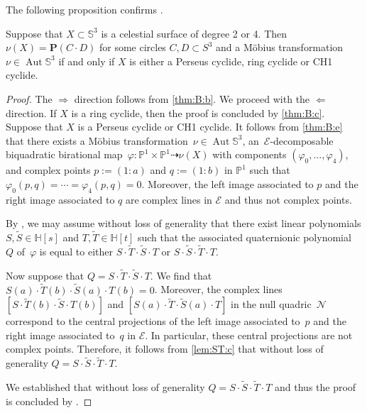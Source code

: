 \documentclass[11pt]{article}
\newcommand{\RL}[2]{\Cref{lem:#1}\ref{lem:#1:#2}}
\renewcommand{\H}{\mathbb{H}}
\renewcommand{\P}{\mathbb{P}}
\renewcommand{\S}{\mathbb{S}}
\newcommand{\bP}{\mathbf{P}}
\newcommand{\cN}{\mathcal{N}}
\newcommand{\cE}{\mathcal{E}}
\newcommand{\tS}{\tilde{S}}
\newcommand{\tT}{\tilde{T}}
\renewcommand{\c}{\colon}
\newcommand{\dto}{\dasharrow}
\newcommand{\aut}{\operatorname{Aut}}
\newcommand{\Wlog}{without loss of generality }
\newcommand{\st}{such that }
\begin{document}
The following proposition confirms \citep[Conjecture~1]{2023trans}.

\begin{proposition}
\label{prp:E4}
Suppose that $X\subset\S^3$ is a celestial surface of degree 2 or 4.
Then $\nu(X)=\bP(C\cdot D)$ for some circles $C,D\subset S^3$ and a
M\"obius transformation $\nu\in\aut\S^3$
if and only if
$X$ is either a Perseus cyclide, ring cyclide or CH1 cyclide.
\end{proposition}

\begin{proof}
The $\Rightarrow$ direction follows from \ref{thm:B:b}.
We proceed with the $\Leftarrow$ direction.
If $X$ is a ring cyclide, then the proof is concluded by \ref{thm:B:c}.
Suppose that $X$ is a Perseus cyclide or CH1 cyclide.
It follows from \ref{thm:B:e} that there exists a
M\"obius transformation~$\nu\in\aut\S^3$,
an~$\cE$-decomposable biquadratic birational map~$\varphi\c\P^1\times\P^1\dto\nu(X)$
with components $(\varphi_0,\ldots,\varphi_4)$,
and complex points $p:=(1:a)$ and $q:=(1:b)$ in $\P^1$
\st
$
\varphi_0(p,q)=\cdots=\varphi_4(p,q)=0
$.
Moreover,
the left image associated to $p$ and the right image
associated to $q$ are complex lines in $\cE$ and thus not complex points.

By , we may assume \Wlog that
there exist linear polynomials $S,\tS\in\H[s]$ and $T,\tT\in\H[t]$
such that the associated quaternionic polynomial~$Q$ of~$\varphi$
is equal to either
$S\cdot \tT\cdot \tS\cdot T$ or $S\cdot\tS\cdot \tT\cdot T$.

Now suppose that $Q=S\cdot \tT\cdot \tS\cdot T$.
We find that $S(a)\cdot\tT(b)\cdot\tS(a)\cdot T(b)=0$.
Moreover, the complex lines~$[S\cdot\tT(b)\cdot\tS\cdot T(b)]$
and $[S(a)\cdot\tT\cdot\tS(a)\cdot T]$ in the null quadric~$\cN$
correspond to the central projections
of the left image associated to~$p$ and the right image associated to~$q$ in $\cE$.
In particular, these central projections are not complex points.
Therefore, it follows from \RL{ST}{c} that
\Wlog $Q=S\cdot\tS\cdot \tT\cdot T$.

We established that \Wlog $Q=S\cdot\tS\cdot \tT\cdot T$
and thus the proof is concluded by .
\end{proof}
\end{document}
